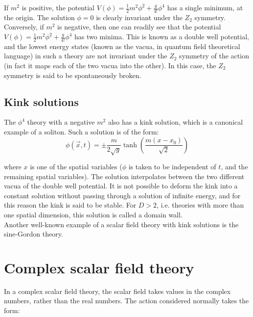 If $m^2$ is positive, the potential $V(\phi)=\frac{1}{2}m^2\phi^2 +\frac{g}{4!}\phi^4$ has a single minimum, at the origin. The solution $\phi=0$ is clearly invariant under the $Z_2$ symmetry. Conversely, if $m^2$ is negative, then one can readily see that the potential $V(\phi)=\frac{1}{2}m^2\phi^2+\frac{g}{4!}\phi^4$ has two minima. This is known as a double well potential, and the lowest energy states (known as the vacua, in quantum field theoretical language) in such a theory are not invariant under the $Z_2$ symmetry of the action (in fact it maps each of the two vacua into the other). In this case, the $Z_2$ symmetry is said to be spontaneously broken.\\

\subsection{Kink solutions}

The $\phi^4$ theory with a negative $m^2$ also has a kink solution, which is a canonical example of a soliton. Such a solution is of the form:\\

\begin{equation}
    \phi(\vec{x},t)=\pm\frac{m}{2\sqrt{g}}\tanh\left(\frac{m(x-x_0)}{\sqrt{2}}\right)
\end{equation}

where $x$ is one of the spatial variables ($\phi$ is taken to be independent of $t$, and the remaining spatial variables). The solution interpolates between the two different vacua of the double well potential. It is not possible to deform the kink into a constant solution without passing through a solution of infinite energy, and for this reason the kink is said to be stable. For $D>2$, i.e. theories with more than one spatial dimension, this solution is called a domain wall.\\

Another well-known example of a scalar field theory with kink solutions is the sine-Gordon theory.\\

\section{Complex scalar field theory}

In a complex scalar field theory, the scalar field takes values in the complex numbers, rather than the real numbers. The action considered normally takes the form:\\


